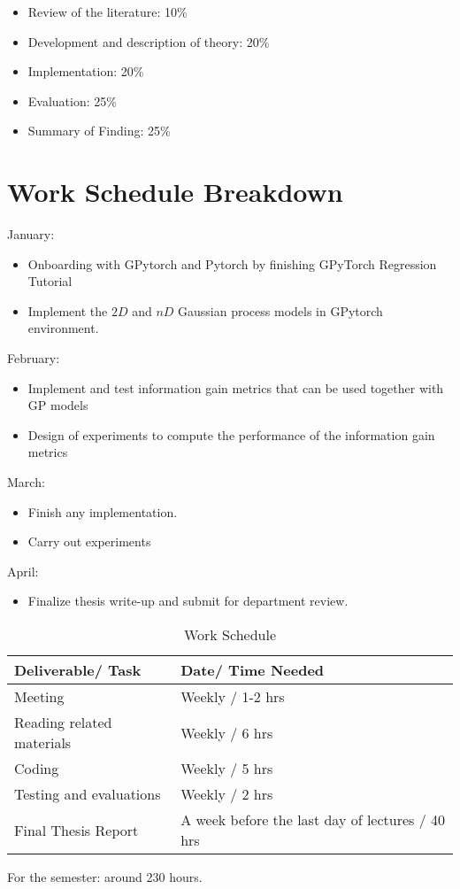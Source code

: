 \documentclass{article}
\begin{document}
\begin{itemize}
    \item Review of the literature: 10\%
    \item Development and description of theory: 20\%
    \item Implementation: 20\%
    \item Evaluation: 25\%
    \item Summary of Finding: 25\%
\end{itemize}

\section{Work Schedule Breakdown}
January:
\begin{itemize}
    \item Onboarding with GPytorch and Pytorch by finishing GPyTorch Regression Tutorial
    \item Implement the $2D$ and $nD$ Gaussian process models in GPytorch environment.
\end{itemize}

February:
\begin{itemize}
    \item Implement and test information gain metrics that can be used together with GP models
    \item Design of experiments to compute the performance of the information gain metrics
\end{itemize}

March:
\begin{itemize}
    \item Finish any implementation.
    \item Carry out experiments
\end{itemize}

April:
\begin{itemize}
    \item Finalize thesis write-up and submit for department review.
\end{itemize}

\begin{table}[h!]
  \caption{Work Schedule}
  \label{work-schedule}
  \centering
  \begin{tabular}{ll}
    \toprule

    Deliverable/ Task & Date/ Time Needed \\

    \midrule

    Meeting & Weekly / 1-2 hrs \\
    Reading related materials & Weekly / 6 hrs \\
    Coding & Weekly / 5 hrs  \\
    Testing and evaluations & Weekly / 2 hrs \\
    Final Thesis Report & A week before the last day of lectures / 40 hrs \\

    \bottomrule
  \end{tabular}
\end{table}

For the semester: around 230 hours.
\end{document}
